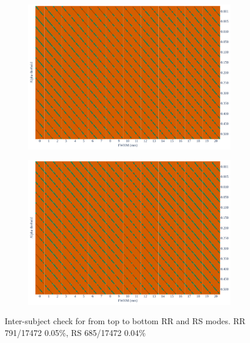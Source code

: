\documentclass{article}
\begin{document}
\begin{appendices}

    \begin{figure}
        \centering
        \begin{subfigure}[t]{0.7\linewidth}
            \includegraphics[width=\linewidth]{figures/inter-subject/one_pce_RR.pdf}
        \end{subfigure}
        \begin{subfigure}[t]{0.7\linewidth}
            \includegraphics[width=\linewidth]{figures/inter-subject/one_pce_RS.pdf}
        \end{subfigure}
        \caption{Inter-subject check for from top to bottom RR and RS modes. RR 791/17472 0.05\%, RS 685/17472 0.04\%}
        \label{fig:ieee-check-pce}
    \end{figure}



\end{appendices}
\end{document}
